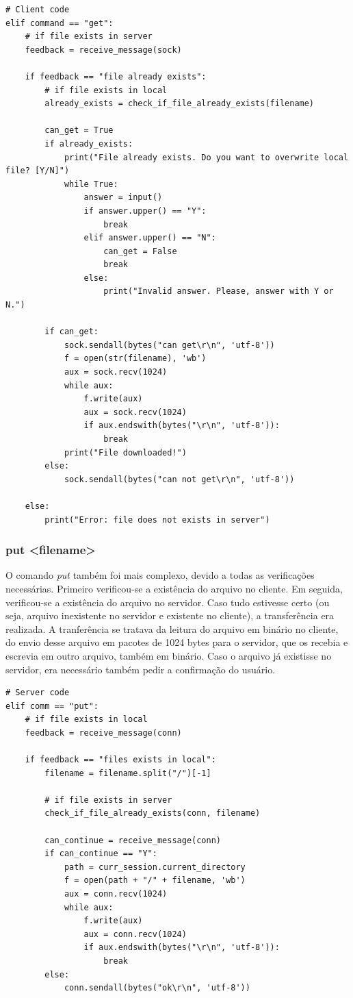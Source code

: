 \documentclass[conference]{IEEEtran}
\begin{document}
\begin{lstlisting}
# Client code
elif command == "get":
	# if file exists in server
	feedback = receive_message(sock)

	if feedback == "file already exists":
		# if file exists in local
		already_exists = check_if_file_already_exists(filename)

		can_get = True
		if already_exists:
			print("File already exists. Do you want to overwrite local file? [Y/N]")
			while True:
				answer = input()
				if answer.upper() == "Y":
					break
				elif answer.upper() == "N":
					can_get = False
					break
				else:
					print("Invalid answer. Please, answer with Y or N.")

		if can_get:
			sock.sendall(bytes("can get\r\n", 'utf-8'))
			f = open(str(filename), 'wb')
			aux = sock.recv(1024)
			while aux:
				f.write(aux)
				aux = sock.recv(1024)
				if aux.endswith(bytes("\r\n", 'utf-8')):
					break
			print("File downloaded!")
		else:
			sock.sendall(bytes("can not get\r\n", 'utf-8'))

	else:
		print("Error: file does not exists in server")
\end{lstlisting}

\subsubsection{put <filename>} O comando \textit{put} também foi mais complexo, devido a todas as verificações necessárias. Primeiro verificou-se a existência do arquivo no cliente. Em seguida, verificou-se a existência do arquivo no servidor. Caso tudo estivesse certo (ou seja, arquivo inexistente no servidor e existente no cliente), a transferência era realizada. A tranferência se tratava da leitura do arquivo em binário no cliente, do envio desse arquivo em pacotes de 1024 bytes para o servidor, que os recebia e escrevia em outro arquivo, também em binário. Caso o arquivo já existisse no servidor, era necessário também pedir a confirmação do usuário.

\begin{lstlisting}
# Server code
elif comm == "put":
	# if file exists in local
	feedback = receive_message(conn)

	if feedback == "files exists in local":
	    filename = filename.split("/")[-1]
	    
	    # if file exists in server
	    check_if_file_already_exists(conn, filename)

	    can_continue = receive_message(conn)
	    if can_continue == "Y":
	    	path = curr_session.current_directory
			f = open(path + "/" + filename, 'wb')
			aux = conn.recv(1024)
			while aux:
		    	f.write(aux)
		    	aux = conn.recv(1024)
		    	if aux.endswith(bytes("\r\n", 'utf-8')):
		        	break
		else:
			conn.sendall(bytes("ok\r\n", 'utf-8'))
\end{lstlisting}
\end{document}
